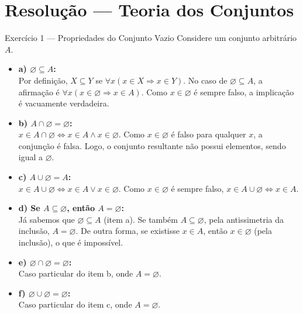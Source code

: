 \documentclass[12pt]{article}
\begin{document}
\vspace*{0.2cm}
\section*{Resolução — Teoria dos Conjuntos}

\begin{block}{Exercício 1 — Propriedades do Conjunto Vazio}
Considere um conjunto arbitrário $A$.
\begin{itemize}
    \item \textbf{a) $\varnothing \subseteq A$:} \\
    Por definição, $X \subseteq Y$ se $\forall x (x \in X \Rightarrow x \in Y)$. No caso de $\varnothing \subseteq A$, a afirmação é $\forall x (x \in \varnothing \Rightarrow x \in A)$. Como $x \in \varnothing$ é sempre falso, a implicação é vacuamente verdadeira.
    
    \item \textbf{b) $A \cap \varnothing = \varnothing$:} \\
    $x \in A \cap \varnothing \iff x \in A \land x \in \varnothing$. Como $x \in \varnothing$ é falso para qualquer $x$, a conjunção é falsa. Logo, o conjunto resultante não possui elementos, sendo igual a $\varnothing$.
    
    \item \textbf{c) $A \cup \varnothing = A$:} \\
    $x \in A \cup \varnothing \iff x \in A \lor x \in \varnothing$. Como $x \in \varnothing$ é sempre falso, $x \in A \cup \varnothing \iff x \in A$.
    
    \item \textbf{d) Se $A \subseteq \varnothing$, então $A = \varnothing$:} \\
    Já sabemos que $\varnothing \subseteq A$ (item a). Se também $A \subseteq \varnothing$, pela antissimetria da inclusão, $A = \varnothing$. De outra forma, se existisse $x \in A$, então $x \in \varnothing$ (pela inclusão), o que é impossível.
    
    \item \textbf{e) $\varnothing \cap \varnothing = \varnothing$:} \\
    Caso particular do item b, onde $A = \varnothing$.
    
    \item \textbf{f) $\varnothing \cup \varnothing = \varnothing$:} \\
    Caso particular do item c, onde $A = \varnothing$.
\end{itemize}
\end{block}
\end{document}
